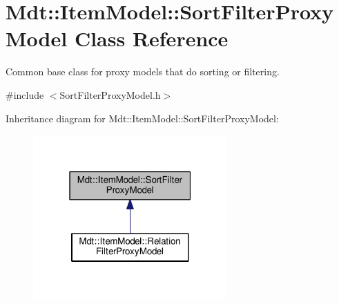 \hypertarget{class_mdt_1_1_item_model_1_1_sort_filter_proxy_model}{}\section{Mdt\+:\+:Item\+Model\+:\+:Sort\+Filter\+Proxy\+Model Class Reference}
\label{class_mdt_1_1_item_model_1_1_sort_filter_proxy_model}


Common base class for proxy models that do sorting or filtering.  




{\ttfamily \#include $<$Sort\+Filter\+Proxy\+Model.\+h$>$}



Inheritance diagram for Mdt\+:\+:Item\+Model\+:\+:Sort\+Filter\+Proxy\+Model\+:\nopagebreak
\begin{figure}[H]
\begin{center}
\leavevmode
\includegraphics[width=211pt]{class_mdt_1_1_item_model_1_1_sort_filter_proxy_model__inherit__graph}
\end{center}
\end{figure}
